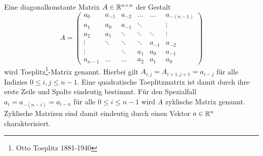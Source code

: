 \begin{defi}
    \label{def:toeplitzM}
    Eine diagonalkonstante Matrix $A \in \mathbb{R}^{n \times n}$ der Gestalt
    \begin{equation*}
    A=
    \begin{pmatrix}
        a_0 & a_{-1} &a_{-2} &\ldots &\ldots &a_{-(n-1)} \\ 
        a_1 & a_0 &a_{-1} &\ddots & &\vdots \\
        a_2 & a_1 &\ddots &\ddots &\ddots &\vdots\\
        \vdots & \ddots &\ddots &\ddots &a_{-1} &a_{-2}\\
        \vdots & &\ddots &a_1 &a_0 &a_{-1} \\
        a_{n-1} &\ldots &\ldots &a_{2} &a_{1} &a_0
    \end{pmatrix}
\end{equation*}
    wird Toeplitz\footnote{Otto Toeplitz 1881-1940}-Matrix genannt. Hierbei gilt $A_{i,j}=A_{i+1,j+1}=a_{i-j}$ für alle Indizies $0 \leq i, j \leq n-1$. Eine quadratische Toeplitzmatrix ist damit durch ihre erste Zeile und Spalte eindeutig bestimmt. Für den Spezialfall $a_i=a_{-(n-i)}=a_{i-n}$ für alle $0 \leq i \leq n-1$ wird $A$ zyklische Matrix genannt. Zyklische Matrizen sind damit eindeutig durch einen Vektor $a \in \mathbb{R}^n$ charakterisiert.
\end{defi}

    
